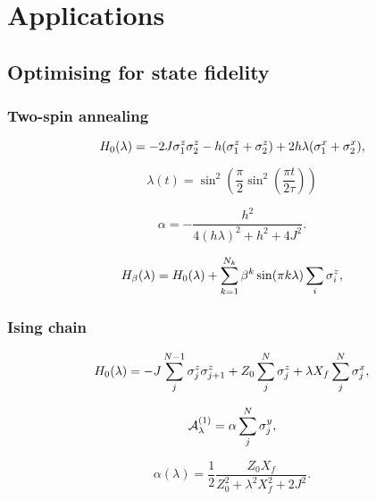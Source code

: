 \part{Applications}

\chapter{Optimising for state fidelity}\label{chap:5_Applications_fidelity}

\section{Two-spin annealing}\label{sec:5.1_2spin_annealing}

\begin{equation}\label{eq:two_spin_hamiltonian}
H_0(\lambda) = -2J \sigma^z_1 \sigma^z_2 - h ( \sigma^z_{1} + \sigma^z_{2}) +  2h \lambda (\sigma^x_{1} + \sigma^x_{2}),
\end{equation}

\begin{equation}\label{eq:lambda_func1}
\lambda(t) = \sin^2\left(\frac{\pi}{2} \sin^2 \left( \frac{\pi t}{2 \tau} \right) \right)
\end{equation}

\begin{equation}\label{eq:two_spin_alpha}
\alpha = - \frac{h^2}{4(h\lambda)^2 + h^2 + 4J^2}.
\end{equation}

\begin{equation}\label{eq:H_optimal_control}
H_\beta(\lambda) = H_0(\lambda) + \sum_{k=1}^{N_k} \beta^k \sin (\pi k \lambda) \sum_i \sigma^z_i,
\end{equation}

\section{Ising chain}\label{sec:5.2_Ising_chain}

\begin{equation}\label{eq:ising_chain_hamiltonian}
    H_0(\lambda) = - J \sum_{j}^{N-1} \sigma^z_j \sigma^z_{j+1} + Z_0\sum_j^N \sigma^z_j + \lambda X_f \sum_j^N \sigma^x_j,
\end{equation}

\begin{equation}
    \mathcal{A}_{\lambda}^{(1)} = \alpha \sum_{j}^N\sigma^y_j,
\end{equation}

\begin{equation}
    \alpha(\lambda) = \frac{1}{2} \frac{Z_0 X_f}{Z_0^2 + \lambda^2 X_f^2 + 2J^2}.
\end{equation}

